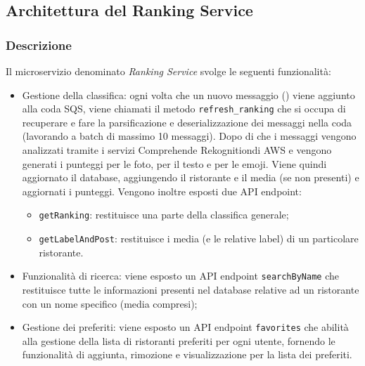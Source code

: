 \subsection{Architettura del Ranking Service}
\subsubsection{Descrizione}
Il microservizio denominato \textit{Ranking Service} svolge le seguenti funzionalità:
\begin{itemize}
	\item Gestione della classifica: ogni volta che un nuovo messaggio () viene aggiunto alla coda SQS, viene chiamati il metodo \texttt{refresh\_ranking} che si occupa di recuperare e fare la parsificazione e deserializzazione dei messaggi nella coda (lavorando a batch di massimo 10 messaggi). Dopo di che i messaggi vengono analizzati tramite i servizi Comprehend\glo e Rekognition\glo di AWS e vengono generati i punteggi per le foto, per il testo e per le emoji. Viene quindi aggiornato il database, aggiungendo il ristorante e il media (se non presenti) e aggiornati i punteggi.
	Vengono inoltre esposti due API endpoint:
		\begin{itemize}
			\item \texttt{getRanking}: restituisce una parte della classifica generale;
			\item \texttt{getLabelAndPost}: restituisce i media (e le relative label\glo) di un particolare ristorante.
		\end{itemize}
	\item Funzionalità di ricerca: viene esposto un API endpoint \texttt{searchByName} che restituisce tutte le informazioni presenti nel database relative ad un ristorante con un nome specifico (media compresi); 
	\item Gestione dei preferiti: viene esposto un API endpoint \texttt{favorites} che abilità alla gestione della lista di ristoranti preferiti per ogni utente, fornendo le funzionalità di aggiunta, rimozione e visualizzazione per la lista dei preferiti.
\end{itemize}

